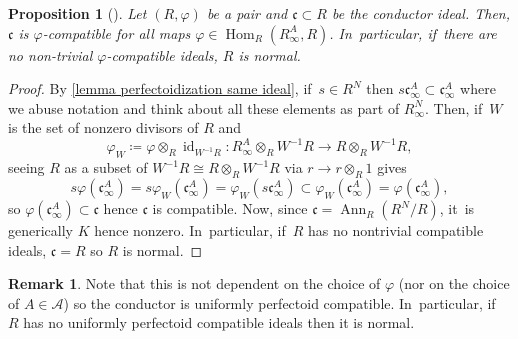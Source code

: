 \documentclass[JEP,XML,SOM,Unicode,published]{cedram}
\let\autoref\cref
\theoremstyle{plain}
\newtheorem{proposition}[theorem]{Proposition}
\theoremstyle{definition}
\newtheorem{remark}[theorem]{Remark}
\numberwithin{equation}{theorem}
\let\tensor\otimes
\newcommand{\fracc}{\mathfrak{c}}
\DeclareMathOperator{\Ann}{{Ann}}
\DeclareMathOperator{\Hom}{Hom}
\DeclareMathOperator{\id}{{id}}
\newcommand{\sA}{\mathcal{A}}
\renewcommand{\phi}{\varphi}
\newcommand{\rphi}{(R,\phi)}
\newcommand{\inv}{^{-1}}
\newcommand{\rafty}{R^A_\infty}
\newcommand{\cafty}{\fracc^A_\infty}
\begin{document}
\begin{proposition}[{\cf \cite[Exer.\,1.2.4\,(E)]{BrionKumarFrobeniusSplitting}}]\label{conductor ideal is compatible}
Let $\rphi$ be a pair and $\fracc\subset R$ be the conductor ideal. Then, $\fracc$ is $\phi$-compatible
for all maps $\phi\in \Hom_R(\rafty,R)$. In~particular, if~there are no non-trivial $\phi$-compatible ideals, $R$ is normal.
\end{proposition}

\begin{proof}
By \autoref{lemma perfectoidization same ideal}, if~$s\in R^N$ then $s\cafty\subset \cafty$ where we abuse notation and think about all these elements as part of $R^N_\infty$. Then, if~$W$ is the set of nonzero divisors of $R$ and
\[
\phi_W\coloneqq \phi\tensor_R \id_{W\inv R}\colon \rafty\tensor_R W\inv R\to R\tensor_R W\inv R,
\]
seeing $R$ as a subset of $W\inv R\cong R\tensor_R W\inv R$ via $r\to r\tensor_R 1$ gives
\[
s\phi(\cafty)=s \phi_W(\cafty)= \phi_W(s \cafty) \subset \phi_W(\cafty)= \phi(\cafty),
\]
so $\phi(\cafty)\subset \fracc$ hence $\fracc$ is compatible. Now, since $\fracc=\Ann_R(R^N/R)$, it~is generically $K$ hence nonzero. In~particular, if~$R$ has no nontrivial compatible ideals, $\fracc=R$ so $R$ is normal.
\end{proof}
\begin{remark}\label{conductor uniformly compatible}
Note that this is not dependent on the choice of $\phi$ (nor on the choice of $A\in \sA$) so the conductor is uniformly perfectoid compatible. In~particular, if~$R$ has no uniformly perfectoid compatible ideals then it is normal.
\end{remark}
\end{document}
